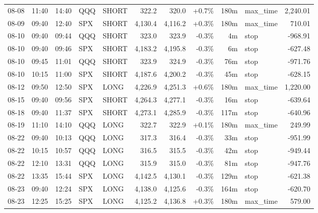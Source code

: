 \documentclass[11pt,a4paper,twoside]{article}
\begin{document}
\begin{center}
\begin{longtable}{>{\color{txtmain}}l l l l l r r r r >{\color{txtmain}}l r}
08-08 & 11:40 & 14:40 & QQQ & SHORT & 322.2 & 320.0 & \textcolor{wingreen}{+0.7\%} & 180m & max\_time & \textcolor{wingreen}{2,240.01} \\
08-09 & 09:40 & 12:40 & SPX & SHORT & 4,130.4 & 4,116.2 & \textcolor{wingreen}{+0.3\%} & 180m & max\_time & \textcolor{wingreen}{710.01} \\
08-10 & 09:40 & 09:44 & QQQ & SHORT & 323.0 & 323.9 & \textcolor{lossred}{-0.3\%} & 4m & stop & \textcolor{lossred}{-968.91} \\
08-10 & 09:40 & 09:46 & SPX & SHORT & 4,183.2 & 4,195.8 & \textcolor{lossred}{-0.3\%} & 6m & stop & \textcolor{lossred}{-627.48} \\
08-10 & 09:45 & 11:01 & QQQ & SHORT & 323.9 & 324.9 & \textcolor{lossred}{-0.3\%} & 76m & stop & \textcolor{lossred}{-971.76} \\
08-10 & 10:15 & 11:00 & SPX & SHORT & 4,187.6 & 4,200.2 & \textcolor{lossred}{-0.3\%} & 45m & stop & \textcolor{lossred}{-628.15} \\
08-12 & 09:50 & 12:50 & SPX & LONG & 4,226.9 & 4,251.3 & \textcolor{wingreen}{+0.6\%} & 180m & max\_time & \textcolor{wingreen}{1,220.00} \\
08-15 & 09:40 & 09:56 & SPX & SHORT & 4,264.3 & 4,277.1 & \textcolor{lossred}{-0.3\%} & 16m & stop & \textcolor{lossred}{-639.64} \\
08-18 & 09:40 & 11:37 & SPX & SHORT & 4,273.1 & 4,285.9 & \textcolor{lossred}{-0.3\%} & 117m & stop & \textcolor{lossred}{-640.96} \\
08-19 & 11:10 & 14:10 & QQQ & LONG & 322.7 & 322.9 & \textcolor{wingreen}{+0.1\%} & 180m & max\_time & \textcolor{wingreen}{249.99} \\
08-22 & 09:40 & 10:13 & QQQ & LONG & 317.3 & 316.4 & \textcolor{lossred}{-0.3\%} & 33m & stop & \textcolor{lossred}{-951.99} \\
08-22 & 10:15 & 10:57 & QQQ & LONG & 316.5 & 315.5 & \textcolor{lossred}{-0.3\%} & 42m & stop & \textcolor{lossred}{-949.44} \\
08-22 & 12:10 & 13:31 & QQQ & LONG & 315.9 & 315.0 & \textcolor{lossred}{-0.3\%} & 81m & stop & \textcolor{lossred}{-947.76} \\
08-22 & 13:35 & 15:44 & SPX & LONG & 4,142.5 & 4,130.1 & \textcolor{lossred}{-0.3\%} & 129m & stop & \textcolor{lossred}{-621.38} \\
08-23 & 09:40 & 12:24 & SPX & LONG & 4,138.0 & 4,125.6 & \textcolor{lossred}{-0.3\%} & 164m & stop & \textcolor{lossred}{-620.70} \\
08-23 & 12:25 & 15:25 & SPX & LONG & 4,125.2 & 4,136.8 & \textcolor{wingreen}{+0.3\%} & 180m & max\_time & \textcolor{wingreen}{579.00} \\

\end{longtable}
\end{center}
\end{document}
